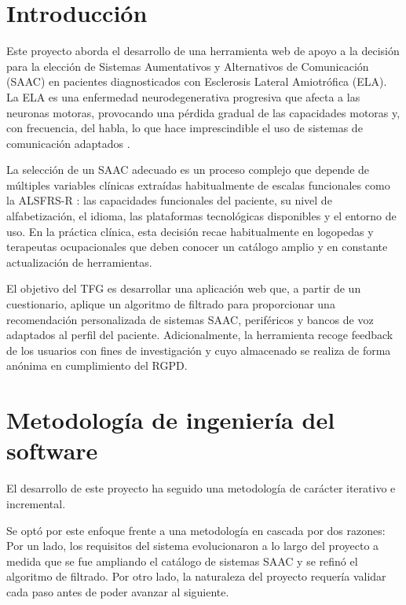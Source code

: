 
\section{Introducción}
Este proyecto aborda el desarrollo de una herramienta web de apoyo a la decisión para la elección de Sistemas Aumentativos y Alternativos de Comunicación (SAAC) en pacientes diagnosticados con Esclerosis Lateral Amiotrófica (ELA). La ELA es una enfermedad neurodegenerativa progresiva que afecta a las neuronas motoras, provocando una pérdida gradual de las capacidades motoras y, con frecuencia, del habla, lo que hace imprescindible el uso de sistemas de comunicación adaptados \cite{lesturnerals:elacomunicacion}.

La selección de un SAAC adecuado es un proceso complejo que depende de múltiples variables clínicas extraídas habitualmente de escalas funcionales como la ALSFRS-R \cite{cedarbaum:alsfrsr}: las capacidades funcionales del paciente, su nivel de alfabetización, el idioma, las plataformas tecnológicas disponibles y el entorno de uso. En la práctica clínica, esta decisión recae habitualmente en logopedas y terapeutas ocupacionales que deben conocer un catálogo amplio y en constante actualización de herramientas.

El objetivo del TFG es desarrollar una aplicación web que, a partir de un cuestionario, aplique un algoritmo de filtrado para proporcionar una recomendación personalizada de sistemas SAAC, periféricos y bancos de voz adaptados al perfil del paciente. Adicionalmente, la herramienta recoge feedback de los usuarios con fines de investigación y cuyo almacenado se realiza de forma anónima en cumplimiento del RGPD.

\section{Metodología de ingeniería del software}
El desarrollo de este proyecto ha seguido una metodología de carácter iterativo e incremental.

Se optó por este enfoque frente a una metodología en cascada por dos razones: Por un lado, los requisitos del sistema evolucionaron a lo largo del proyecto a medida que se fue ampliando el catálogo de sistemas SAAC y se refinó el algoritmo de filtrado. Por otro lado, la naturaleza del proyecto requería validar cada paso antes de poder avanzar al siguiente.

